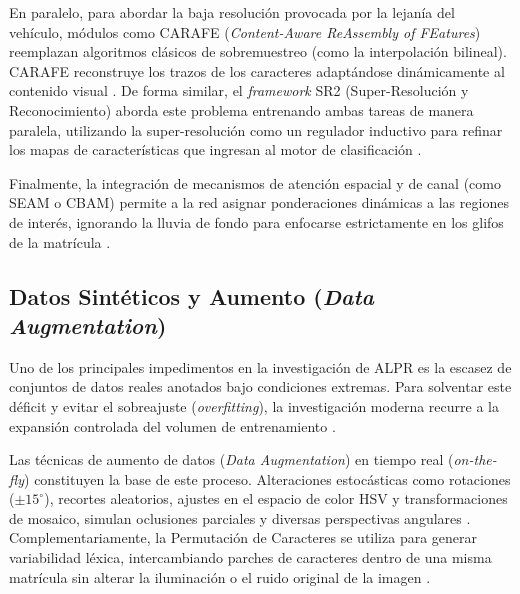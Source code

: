 En paralelo, para abordar la baja resolución provocada por la lejanía del vehículo, 
módulos como CARAFE (\textit{Content-Aware ReAssembly of FEatures}) reemplazan algoritmos 
clásicos de sobremuestreo (como la interpolación bilineal). CARAFE reconstruye los trazos 
de los caracteres adaptándose dinámicamente al contenido visual 
\parencite{xiongLicensePlateRecognition2026}. De forma similar, el \textit{framework} SR2 
(Super-Resolución y Reconocimiento) aborda este problema entrenando ambas tareas de manera 
paralela, utilizando la super-resolución como un regulador inductivo para refinar los 
mapas de características que ingresan al motor de clasificación 
\parencite{schirrmacherBenchmarkingProbabilisticDeep2023}.

Finalmente, la integración de mecanismos de atención espacial y de canal (como SEAM o CBAM) 
permite a la red asignar ponderaciones dinámicas a las regiones de interés, ignorando 
la lluvia de fondo para enfocarse estrictamente en los glifos de la matrícula 
\parencite{xiongLicensePlateRecognition2026, xuDeepLearningAlgorithms2026c}.

\subsection{Datos Sintéticos y Aumento (\textit{Data Augmentation})}

Uno de los principales impedimentos en la investigación de ALPR es la escasez de conjuntos de 
datos reales anotados bajo condiciones extremas. Para solventar este déficit y evitar el 
sobreajuste (\textit{overfitting}), la investigación moderna recurre a la expansión controlada 
del volumen de entrenamiento \parencite{larocaAdvancingMultinationalLicense2025, meesadAdvancedDeepLearning2025a}.

Las técnicas de aumento de datos (\textit{Data Augmentation}) en tiempo real (\textit{on-the-fly}) 
constituyen la base de este proceso. Alteraciones estocásticas como rotaciones ($\pm15^\circ$), 
recortes aleatorios, ajustes en el espacio de color HSV y transformaciones de mosaico, 
simulan oclusiones parciales y diversas perspectivas angulares 
\parencite{buleuDeepLearningBasedSystem2025a, vargooraniLicensePlateDetection2024}. 
Complementariamente, la Permutación de Caracteres se utiliza para generar variabilidad 
léxica, intercambiando parches de caracteres dentro de una misma matrícula sin alterar 
la iluminación o el ruido original de la imagen \parencite{larocaAdvancingMultinationalLicense2025}.

